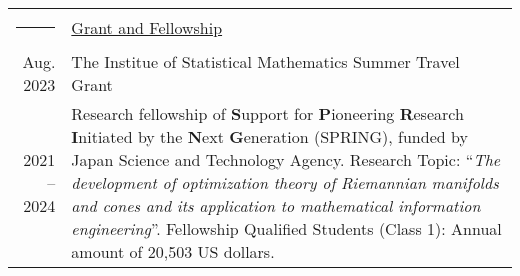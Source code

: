 \documentclass[a4paper,10pt]{article}
\newcommand{\headingfont}{\LARGE \MakeUppercase }
\newenvironment{SectionTable}[1]{
	\renewcommand*{\arraystretch}{1.0}
	\setlength{\tabcolsep}{10pt}
	\begin{longtable}{Rp{5.2in}} 
		\rule{2.3cm}{4pt} 
		& \underline{#1} \\ %
	}
	{
	\end{longtable}\vspace{-.3cm}
}
\begin{document}
\begin{SectionTable}{\headingfont Grant and Fellowship}
	Aug. 2023 & The Institue of Statistical Mathematics Summer Travel Grant \\
	
	2021 -- 2024 &
	Research fellowship of 
	{\textbf{S}upport for \textbf{P}ioneering \textbf{R}esearch \textbf{I}nitiated by the \textbf{N}ext \textbf{G}eneration} (SPRING), funded by Japan Science and Technology Agency. \newline
	Research Topic: ``\textit{The development of optimization theory of Riemannian manifolds and cones and its application to mathematical information engineering}''. \newline
	Fellowship Qualified Students (Class 1):
	Annual amount of 20,503 US dollars.
\end{SectionTable}

\end{document}
